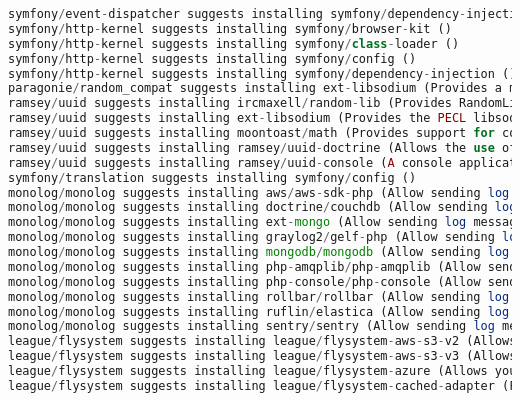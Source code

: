 \begin{lstlisting}[language=PHP]
symfony/event-dispatcher suggests installing symfony/dependency-injection ()
symfony/http-kernel suggests installing symfony/browser-kit ()
symfony/http-kernel suggests installing symfony/class-loader ()
symfony/http-kernel suggests installing symfony/config ()
symfony/http-kernel suggests installing symfony/dependency-injection ()
paragonie/random_compat suggests installing ext-libsodium (Provides a modern crypto API that can be used to generate random bytes.)
ramsey/uuid suggests installing ircmaxell/random-lib (Provides RandomLib for use with the RandomLibAdapter)
ramsey/uuid suggests installing ext-libsodium (Provides the PECL libsodium extension for use with the SodiumRandomGenerator)
ramsey/uuid suggests installing moontoast/math (Provides support for converting UUID to 128-bit integer (in string form).)
ramsey/uuid suggests installing ramsey/uuid-doctrine (Allows the use of Ramsey\Uuid\Uuid as Doctrine field type.)
ramsey/uuid suggests installing ramsey/uuid-console (A console application for generating UUIDs with ramsey/uuid)
symfony/translation suggests installing symfony/config ()
monolog/monolog suggests installing aws/aws-sdk-php (Allow sending log messages to AWS services like DynamoDB)
monolog/monolog suggests installing doctrine/couchdb (Allow sending log messages to a CouchDB server)
monolog/monolog suggests installing ext-mongo (Allow sending log messages to a MongoDB server)
monolog/monolog suggests installing graylog2/gelf-php (Allow sending log messages to a GrayLog2 server)
monolog/monolog suggests installing mongodb/mongodb (Allow sending log messages to a MongoDB server via PHP Driver)
monolog/monolog suggests installing php-amqplib/php-amqplib (Allow sending log messages to an AMQP server using php-amqplib)
monolog/monolog suggests installing php-console/php-console (Allow sending log messages to Google Chrome)
monolog/monolog suggests installing rollbar/rollbar (Allow sending log messages to Rollbar)
monolog/monolog suggests installing ruflin/elastica (Allow sending log messages to an Elastic Search server)
monolog/monolog suggests installing sentry/sentry (Allow sending log messages to a Sentry server)
league/flysystem suggests installing league/flysystem-aws-s3-v2 (Allows you to use S3 storage with AWS SDK v2)
league/flysystem suggests installing league/flysystem-aws-s3-v3 (Allows you to use S3 storage with AWS SDK v3)
league/flysystem suggests installing league/flysystem-azure (Allows you to use Windows Azure Blob storage)
league/flysystem suggests installing league/flysystem-cached-adapter (Flysystem adapter decorator for metadata caching)

\end{lstlisting}
